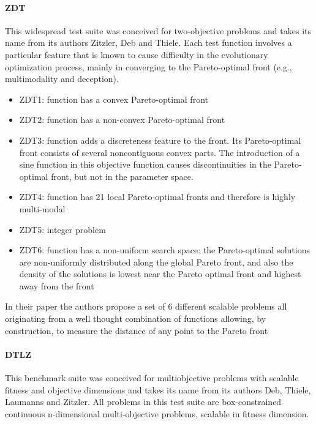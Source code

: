     \paragraph{ZDT}
    This widespread test suite\cite{ZitzlerDT00} was conceived for two-objective problems and takes its name from its authors Zitzler, Deb and Thiele. Each test function involves a particular feature that is known to cause difficulty in the evolutionary optimization process, mainly in converging to the Pareto-optimal front (e.g., multimodality and deception).

    \begin{itemize}
        \item ZDT1: function has a convex Pareto-optimal front
        \item ZDT2: function has a non-convex Pareto-optimal front
        \item ZDT3: function adds a discreteness feature to the front. Its Pareto-optimal front consists of several noncontiguous convex parts. The introduction of a sine function in this objective function causes discontinuities in the Pareto-optimal front, but not in the parameter space.
        \item ZDT4: function has 21 local Pareto-optimal fronts and therefore is highly multi-modal
        \item ZDT5: integer problem
        \item ZDT6: function has a non-uniform search space: the Pareto-optimal solutions are non-uniformly distributed along the global Pareto front, and also the density of the solutions is lowest near the Pareto optimal front and highest away from the front
    \end{itemize}

    In their paper the authors propose a set of 6 different scalable problems all originating from a well thought combination of functions allowing, by construction, to measure the distance of any point to the Pareto front

    \paragraph{DTLZ}
    This benchmark suite\cite{DebTLZ05} was conceived for multiobjective problems with scalable fitness and objective dimensions and takes its name from its authors Deb, Thiele, Laumanns and Zitzler. All problems in this test suite are box-constrained continuous n-dimensional multi-objective problems, scalable in fitness dimension.

